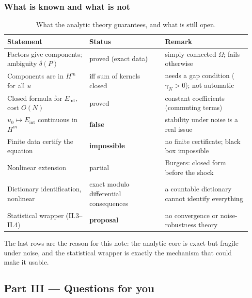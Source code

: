 \documentclass[11pt]{article}
\theoremstyle{plain}
\theoremstyle{definition}
\theoremstyle{remark}
\newcommand{\Eint}{E_{\mathrm{int}}}        %
\begin{document}
\subsubsection{What is known and what is not}
\begin{table}[!htb]
\centering\small
\begin{tabular}{@{}p{5.2cm}p{3.2cm}p{5.5cm}@{}}
\toprule
Statement & Status & Remark\\\midrule
Factors give components; ambiguity $\delta(P)$ & proved (exact data) & simply connected $\Omega$; fails otherwise\\
Components are in $H^m$ for all $u$ & iff sum of kernels closed & needs a gap condition ($\gamma_N>0$); not automatic\\
Closed formula for $\Eint$, cost $O(N)$ & proved & constant coefficients (commuting terms)\\
$u_0\mapsto\Eint$ continuous in $H^m$ & \textbf{false} & stability under noise is a real issue\\
Finite data certify the equation & \textbf{impossible} & no finite certificate; black box impossible\\
Nonlinear extension & partial & Burgers: closed form before the shock\\
Dictionary identification, nonlinear & exact modulo differential consequences & a countable dictionary cannot identify everything\\
Statistical wrapper (II.3--II.4) & \textbf{proposal} & no convergence or noise-robustness theory\\
\bottomrule
\end{tabular}
\caption{What the analytic theory guarantees, and what is still open.}
\end{table}

The last rows are the reason for this note: the analytic core is exact but fragile under noise, and the statistical wrapper is exactly the mechanism that could make it usable.

\subsection*{Part III --- Questions for you}
\end{document}
